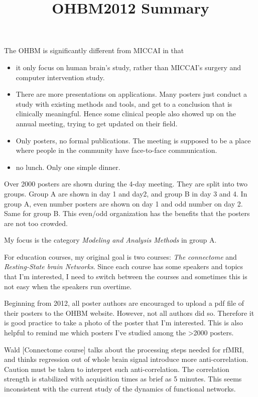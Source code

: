 \documentclass[12pt]{article}
\begin{document}
\title{OHBM2012 Summary} 
\maketitle 
\hspace{6 pt}

The OHBM is significantly different from MICCAI in that
\begin{itemize}
  \item it only focus on human brain's study, rather than MICCAI's surgery and computer intervention study.
  \item There are more presentations on applications. Many posters just conduct a study with existing methods and tools, and get to a conclusion that is clinically meaningful. Hence some clinical people also showed up on the annual meeting, trying to get updated on their field. 
  \item Only posters, no formal publications. The meeting is supposed to be a place where people in the community have face-to-face communication.
  \item no lunch. Only one simple dinner.
\end{itemize}

Over 2000 posters are shown during the 4-day meeting. They are split into two groups. Group A are shown in day 1 and day2, and group B in day 3 and 4. In group A, even number posters are shown on day 1 and odd number on day 2. Same for group B. This even/odd organization has the benefits that the posters are not too crowded. 

My focus is the category \emph{Modeling and Analysis Methods} in group A. 

For education courses, my original goal is two courses: \emph{The connectome} and \emph{Resting-State brain Networks}. Since each course has some speakers and topics that I'm interested, I need to switch between the courses and sometimes this is not easy when the speakers run overtime. 

Beginning from 2012, all poster authors are encouraged to upload a pdf file of their posters to the OHBM website. However, not all authors did so. Therefore it is good practice to take a photo of the poster that I'm interested. This is also helpful to remind me which posters I've studied among the >2000 posters.

Wald [Connectome course] talks about the processing steps needed for rfMRI, and thinks regression out of whole brain signal introduce more anti-correlation. Caution must be taken to interpret such anti-correlation. The correlation strength is stabilized with acquisition times as brief as 5 minutes. This seems inconsistent with the current study of the dynamics of functional networks.
\end{document}

